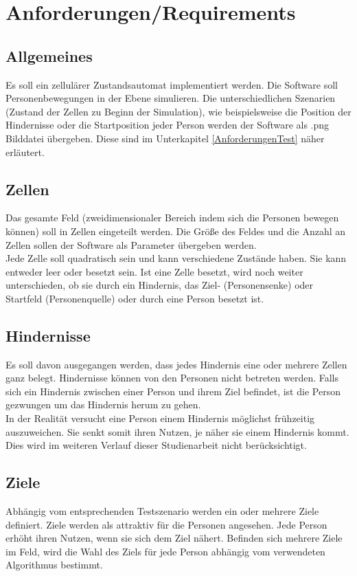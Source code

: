 \section{Anforderungen/Requirements}
\label{requirements}

\subsection{Allgemeines}
Es soll ein zellulärer Zustandsautomat implementiert werden. Die Software soll Personenbewegungen in der Ebene simulieren. Die unterschiedlichen Szenarien (Zustand der Zellen zu Beginn der Simulation), wie beispielsweise die Position der Hindernisse oder die Startposition jeder Person werden der Software als .png Bilddatei übergeben. Diese sind im Unterkapitel \ref{AnforderungenTest} näher erläutert. 



\subsection{Zellen}
Das gesamte Feld (zweidimensionaler Bereich indem sich die Personen bewegen können) soll in Zellen eingeteilt werden. Die Größe des Feldes und die Anzahl an Zellen sollen der Software als Parameter übergeben werden.\\
Jede Zelle soll quadratisch sein und kann verschiedene Zustände haben. Sie kann entweder leer oder besetzt sein. Ist eine Zelle besetzt, wird noch weiter unterschieden, ob sie durch ein Hindernis, das Ziel- (Personensenke) oder Startfeld (Personenquelle) oder durch eine Person besetzt ist.

\subsection{Hindernisse}
Es soll davon ausgegangen werden, dass jedes Hindernis eine oder mehrere Zellen ganz belegt. Hindernisse können von den Personen nicht betreten werden. Falls sich ein Hindernis zwischen einer Person und ihrem Ziel befindet, ist die Person gezwungen um das Hindernis herum zu gehen. \\
In der Realität versucht eine Person einem Hindernis möglichst frühzeitig auszuweichen. Sie senkt somit ihren Nutzen, je näher sie einem Hindernis kommt. Dies wird im weiteren Verlauf dieser Studienarbeit nicht berücksichtigt.

\subsection{Ziele}
Abhängig vom entsprechenden Testszenario werden ein oder mehrere Ziele definiert. Ziele werden als attraktiv für die Personen angesehen. Jede Person erhöht ihren Nutzen, wenn sie sich dem Ziel nähert. Befinden sich mehrere Ziele im Feld, wird die Wahl des Ziels für jede Person abhängig vom verwendeten Algorithmus bestimmt. 

